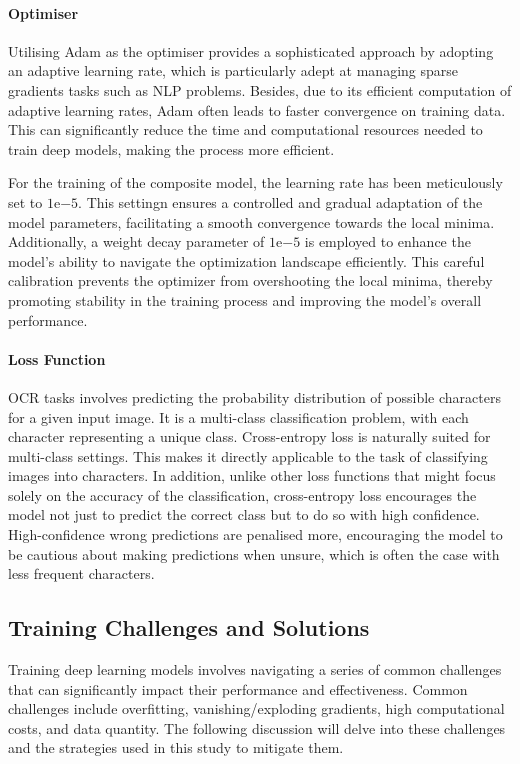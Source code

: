 \paragraph*{Optimiser}
\label{par:4_Optimiser}
Utilising Adam as the optimiser provides a sophisticated approach by adopting an adaptive learning rate, which is particularly adept at managing sparse gradients tasks such as NLP problems. Besides, due to its efficient computation of adaptive learning rates, Adam often leads to faster convergence on training data. This can significantly reduce the time and computational resources needed to train deep models, making the process more efficient.

For the training of the composite model, the learning rate has been meticulously set to $1\mathrm{e}{-5}$. This settingn ensures a controlled and gradual adaptation of the model parameters, facilitating a smooth convergence towards the local minima. Additionally, a weight decay parameter of $1\mathrm{e}{-5}$ is employed to enhance the model's ability to navigate the optimization landscape efficiently. This careful calibration prevents the optimizer from overshooting the local minima, thereby promoting stability in the training process and improving the model's overall performance.

\paragraph*{Loss Function}
\label{par:4_loss_function}
OCR tasks involves predicting the probability distribution of possible characters for a given input image. It is a multi-class classification problem, with each character representing a unique class. Cross-entropy loss is naturally suited for multi-class settings. This makes it directly applicable to the task of classifying images into characters. In addition, unlike other loss functions that might focus solely on the accuracy of the classification, cross-entropy loss encourages the model not just to predict the correct class but to do so with high confidence. High-confidence wrong predictions are penalised more, encouraging the model to be cautious about making predictions when unsure, which is often the case with less frequent characters.

\subsection{Training Challenges and Solutions}
\label{subsec:4_training_challenges_and_solutions}
Training deep learning models involves navigating a series of common challenges that can significantly impact their performance and effectiveness. Common challenges include overfitting, vanishing/exploding gradients, high computational costs, and data quantity. The following discussion will delve into these challenges and the strategies used in this study to mitigate them.

